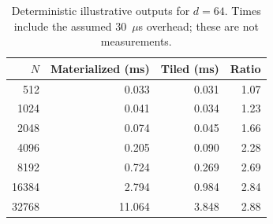 \begin{table}[t]
\caption{Deterministic illustrative outputs for $d=64$. Times include the assumed 30~$\mu$s overhead; these are not measurements.}
\label{tab:results}
\centering
\begin{tabular}{rrrr}
\toprule
$N$ & Materialized (ms) & Tiled (ms) & Ratio \\
\midrule
512 & 0.033 & 0.031 & 1.07 \\
1024 & 0.041 & 0.034 & 1.23 \\
2048 & 0.074 & 0.045 & 1.66 \\
4096 & 0.205 & 0.090 & 2.28 \\
8192 & 0.724 & 0.269 & 2.69 \\
16384 & 2.794 & 0.984 & 2.84 \\
32768 & 11.064 & 3.848 & 2.88 \\
\bottomrule
\end{tabular}
\end{table}
